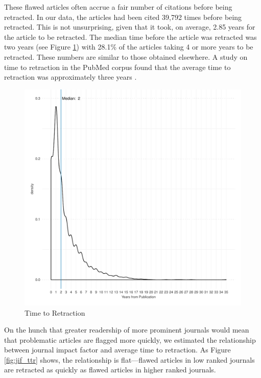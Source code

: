 \documentclass[12pt, letterpaper]{article}
\begin{document}
These flawed articles often accrue a fair number of citations before being retracted. In our data, the articles had been cited 39,792 times before being retracted. This is not unsurprising, given that it took, on average, 2.85 years for the article to be retracted. The median time before the article was retracted was two years (see Figure \ref{fig:ttr}) with 28.1\% of the articles taking 4 or more years to be retracted. These numbers are similar to those obtained elsewhere. A study on time to retraction in the PubMed corpus found that the average time to retraction was approximately three years  \citep{steen2013has}. 

\begin{figure}[H]
\centering
\includegraphics[scale=.7]{../figs/time_to_retraction.pdf}
\caption{Time to Retraction}
\label{fig:ttr}
\end{figure}

On the hunch that greater readership of more prominent journals would mean that problematic articles are flagged more quickly, we estimated the relationship between journal impact factor and average time to retraction. As Figure \ref{fig:jif_ttr} shows, the relationship is flat---flawed articles in low ranked journals are retracted as quickly as flawed articles in higher ranked journals.
\end{document}
